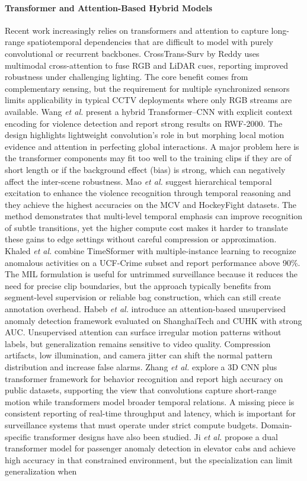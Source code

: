 \documentclass[AMA,Times1COL]{WileyNJDv5} %
\begin{document}
\paragraph{Transformer and Attention-Based Hybrid Models}
Recent work increasingly relies on transformers and attention to capture long-range spatiotemporal dependencies that are difficult to model with purely convolutional or recurrent backbones. CrossTrans-Surv by Reddy \cite{b15} uses multimodal cross-attention to fuse RGB and LiDAR cues, reporting improved robustness under challenging lighting. The core benefit comes from complementary sensing, but the requirement for multiple synchronized sensors limits applicability in typical CCTV deployments where only RGB streams are available. Wang \textit{et al.} \cite{b16} present a hybrid Transformer--CNN with explicit context encoding for violence detection and report strong results on RWF-2000. The design highlights lightweight convolution's role in but morphing local motion evidence and attention in perfecting global interactions. A major problem here is the transformer components may fit too well to the training clips if they are of short length or if the background effect (bias) is strong, which can negatively affect the inter-scene robustness. Mao \textit{et al.}\cite{b17} suggest hierarchical temporal excitation to enhance the violence recognition through temporal reasoning and they achieve the highest accuracies on the MCV and HockeyFight datasets. The method demonstrates that multi-level temporal emphasis can improve recognition of subtle transitions, yet the higher compute cost makes it harder to translate these gains to edge settings without careful compression or approximation. Khaled \textit{et al.} \cite{b18} combine TimeSformer with multiple-instance learning to recognize anomalous activities on a UCF-Crime subset and report performance above 90\%. The MIL formulation is useful for untrimmed surveillance because it reduces the need for precise clip boundaries, but the approach typically benefits from segment-level supervision or reliable bag construction, which can still create annotation overhead. Habeb \textit{et al.} \cite{b19} introduce an attention-based unsupervised anomaly detection framework evaluated on ShanghaiTech and CUHK with strong AUC. Unsupervised attention can surface irregular motion patterns without labels, but generalization remains sensitive to video quality. Compression artifacts, low illumination, and camera jitter can shift the normal pattern distribution and increase false alarms. Zhang \textit{et al.} \cite{b20} explore a 3D CNN plus transformer framework for behavior recognition and report high accuracy on public datasets, supporting the view that convolutions capture short-range motion while transformers model broader temporal relations. A missing piece is consistent reporting of real-time throughput and latency, which is important for surveillance systems that must operate under strict compute budgets. Domain-specific transformer designs have also been studied. Ji \textit{et al.} \cite{b21} propose a dual transformer model for passenger anomaly detection in elevator cabs and achieve high accuracy in that constrained environment, but the specialization can limit generalization when 
\end{document}
